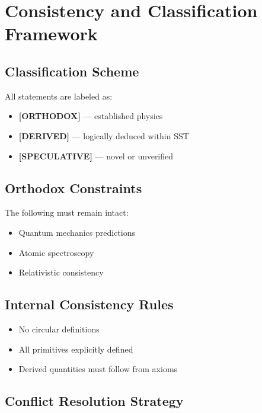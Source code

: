 \section{Consistency and Classification Framework}
    \label{sec:consistency}
    
    \subsection{Classification Scheme}
        
        All statements are labeled as:
        
        \begin{itemize}
            \item \textbf{[ORTHODOX]} — established physics
            \item \textbf{[DERIVED]} — logically deduced within SST
            \item \textbf{[SPECULATIVE]} — novel or unverified
        \end{itemize}
    
    \subsection{Orthodox Constraints}
        
        The following must remain intact:
        
        \begin{itemize}
            \item Quantum mechanics predictions
            \item Atomic spectroscopy
            \item Relativistic consistency
        \end{itemize}
    
    \subsection{Internal Consistency Rules}
        
        \begin{itemize}
            \item No circular definitions
            \item All primitives explicitly defined
            \item Derived quantities must follow from axioms
        \end{itemize}
    
    \subsection{Conflict Resolution Strategy}
        
